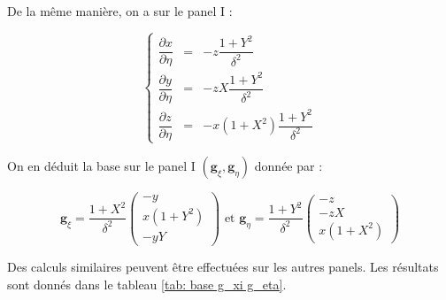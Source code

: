 De la même manière, on a sur le panel I :

\begin{equation}
\left\lbrace
\begin{array}{rcl}
\dfrac{\partial x}{\partial \eta} & = & - z\dfrac{1+Y^2}{\delta^2}\\
\dfrac{\partial y}{\partial \eta} & = & - zX\dfrac{1+Y^2}{\delta^2}\\
\dfrac{\partial z}{\partial \eta} & = & - x(1+X^2) \dfrac{1+Y^2}{\delta^2}
\end{array}
\right.
\end{equation}

On en déduit la base sur le panel I $\left( \mathbf{g}_{\xi}, \mathbf{g}_{\eta} \right)$ donnée par :

\begin{equation}
\mathbf{g}_{\xi} = \dfrac{1+X^2}{\delta^2} \begin{pmatrix}
-y \\ x(1+Y^2) \\ -yY
\end{pmatrix} \text{ et } \mathbf{g}_{\eta} = \dfrac{1+Y^2}{\delta^2} \begin{pmatrix}
-z \\ -zX \\ x(1+X^2)
\end{pmatrix}
\label{eq: base locale I}
\end{equation}

Des calculs similaires peuvent être effectuées sur les autres panels. Les résultats sont donnés dans le tableau \ref{tab: base g_xi g_eta}.

